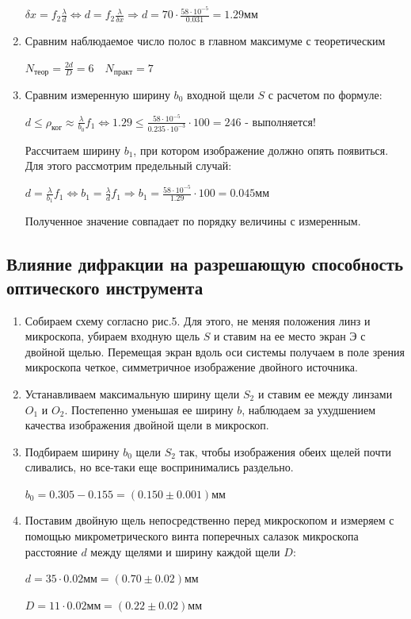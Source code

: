 \documentclass[a4paper,12pt]{article}
\begin{document}
\begin{enumerate}
    $\delta x=f_2\frac{\lambda}{d} \Leftrightarrow d=f_2\frac{\lambda}{\delta x} \Longrightarrow d=70\cdot\frac{58\cdot10^{-5}}{0.031}=1.29\text{мм}$

    \item Сравним наблюдаемое число полос в главном максимуме с теоретическим

    $N_\text{теор} = \frac{2d}{D} = 6\quad N_\text{практ} = 7$

    \item Сравним измеренную ширину $b_0$ входной щели $S$ с расчетом по формуле: 

    $d \leq\rho_{\text{ког}} \approx \frac{\lambda}{b_0}f_1 \Longleftrightarrow 1.29\leq\frac{58\cdot10^{-5}}{0.235\cdot10^{-3}}\cdot100=246$ - выполняется!

    Рассчитаем ширину $b_1$, при котором изображение должно опять появиться. Для этого рассмотрим предельный случай:

    $d =\frac{\lambda}{b_1}f_1 \Longleftrightarrow b_1=\frac{\lambda}{d}f_1 \Longrightarrow b_1=\frac{58\cdot10^{-5}}{1.29}\cdot100=0.045\text{мм}$

    Полученное значение совпадает по порядку величины с измеренным.
\end{enumerate}

\subsection{Влияние дифракции на разрешающую способность оптического инструмента}
\begin{enumerate}
    \item Собираем схему согласно рис.5. Для этого, не меняя положения линз и микроскопа, убираем входную щель $S$ и ставим на ее место экран Э с двойной щелью. Перемещая экран вдоль оси системы получаем в поле зрения микроскопа четкое, симметричное изображение двойного источника.
    \item Устанавливаем максимальную ширину щели $S_2$ и ставим ее между линзами $O_1$ и $O_2$. Постепенно уменьшая ее ширину $b$, наблюдаем за ухудшением качества изображения двойной щели в микроскоп.
    \item Подбираем ширину $b_0$ щели $S_2$ так, чтобы изображения обеих щелей почти сливались, но все-таки еще воспринимались раздельно.

    $b_0 = 0.305-0.155=(0.150\pm0.001)\text{мм}$
    \item Поставим двойную щель непосредственно перед микроскопом и измеряем с помощью микрометрического винта поперечных салазок микроскопа расстояние $d$ между щелями и ширину каждой щели $D$:

    $d = 35 \cdot 0.02\text{мм} = (0.70\pm0.02)\text{мм}$
    
    $D = 11 \cdot 0.02\text{мм} = (0.22\pm0.02)\text{мм}$
\end{enumerate}
\end{document}
